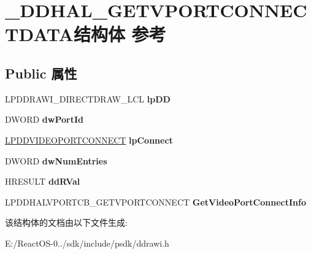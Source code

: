 \hypertarget{struct___d_d_h_a_l___g_e_t_v_p_o_r_t_c_o_n_n_e_c_t_d_a_t_a}{}\section{\+\_\+\+D\+D\+H\+A\+L\+\_\+\+G\+E\+T\+V\+P\+O\+R\+T\+C\+O\+N\+N\+E\+C\+T\+D\+A\+T\+A结构体 参考}
\label{struct___d_d_h_a_l___g_e_t_v_p_o_r_t_c_o_n_n_e_c_t_d_a_t_a}
\subsection*{Public 属性}
\begin{DoxyCompactItemize}
\item 
\mbox{\label{struct___d_d_h_a_l___g_e_t_v_p_o_r_t_c_o_n_n_e_c_t_d_a_t_a_ad9249795ed135701b4926c6cf2f3840e}} 
L\+P\+D\+D\+R\+A\+W\+I\+\_\+\+D\+I\+R\+E\+C\+T\+D\+R\+A\+W\+\_\+\+L\+CL {\bfseries lp\+DD}
\item 
\mbox{\label{struct___d_d_h_a_l___g_e_t_v_p_o_r_t_c_o_n_n_e_c_t_d_a_t_a_ad665ffa62d16ca0ab9f22b588c62c0a9}} 
D\+W\+O\+RD {\bfseries dw\+Port\+Id}
\item 
\mbox{\label{struct___d_d_h_a_l___g_e_t_v_p_o_r_t_c_o_n_n_e_c_t_d_a_t_a_ae4293163d4308698d560faa871a797b6}} 
\hyperlink{struct___d_d_v_i_d_e_o_p_o_r_t_c_o_n_n_e_c_t}{L\+P\+D\+D\+V\+I\+D\+E\+O\+P\+O\+R\+T\+C\+O\+N\+N\+E\+CT} {\bfseries lp\+Connect}
\item 
\mbox{\label{struct___d_d_h_a_l___g_e_t_v_p_o_r_t_c_o_n_n_e_c_t_d_a_t_a_a47e24c760cbe0954066fa7864652ec90}} 
D\+W\+O\+RD {\bfseries dw\+Num\+Entries}
\item 
\mbox{\label{struct___d_d_h_a_l___g_e_t_v_p_o_r_t_c_o_n_n_e_c_t_d_a_t_a_a75079fb7c01a97b166b6a764e44e2ead}} 
H\+R\+E\+S\+U\+LT {\bfseries dd\+R\+Val}
\item 
\mbox{\label{struct___d_d_h_a_l___g_e_t_v_p_o_r_t_c_o_n_n_e_c_t_d_a_t_a_afc147b4e9c852edef67724ed12fe5d5d}} 
L\+P\+D\+D\+H\+A\+L\+V\+P\+O\+R\+T\+C\+B\+\_\+\+G\+E\+T\+V\+P\+O\+R\+T\+C\+O\+N\+N\+E\+CT {\bfseries Get\+Video\+Port\+Connect\+Info}
\end{DoxyCompactItemize}


该结构体的文档由以下文件生成\+:\begin{DoxyCompactItemize}
\item 
E\+:/\+React\+O\+S-\/0../sdk/include/psdk/ddrawi.\+h\end{DoxyCompactItemize}
